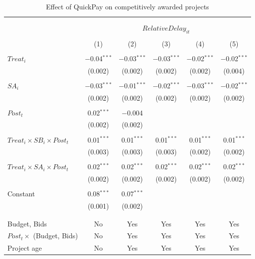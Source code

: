 \documentclass[
]{article}
\begin{document}
\begin{table}[H] \centering 
  \caption{Effect of QuickPay on competitively awarded projects} 
  \label{} 
\small 
\begin{tabular}{@{\extracolsep{-2pt}}lccccc} 
\\[-1.8ex]\hline 
\hline \\[-1.8ex] 
\\[-1.8ex] & \multicolumn{5}{c}{$RelativeDelay_{it}$  } \\ 
\\[-1.8ex] & (1) & (2) & (3) & (4) & (5)\\ 
\hline \\[-1.8ex] 
 $Treat_i$ & $-$0.04$^{***}$ & $-$0.03$^{***}$ & $-$0.03$^{***}$ & $-$0.02$^{***}$ & $-$0.02$^{***}$ \\ 
  & (0.002) & (0.002) & (0.002) & (0.002) & (0.004) \\ 
  & & & & & \\ 
 $SA_i$ & $-$0.03$^{***}$ & $-$0.01$^{***}$ & $-$0.02$^{***}$ & $-$0.03$^{***}$ & $-$0.02$^{***}$ \\ 
  & (0.002) & (0.002) & (0.002) & (0.002) & (0.002) \\ 
  & & & & & \\ 
 $Post_t$ & 0.02$^{***}$ & $-$0.004 &  &  &  \\ 
  & (0.002) & (0.002) &  &  &  \\ 
  & & & & & \\ 
 $Treat_i \times SB_i \times Post_t$ & 0.01$^{***}$ & 0.01$^{***}$ & 0.01$^{***}$ & 0.01$^{***}$ & 0.01$^{***}$ \\ 
  & (0.003) & (0.003) & (0.003) & (0.002) & (0.002) \\ 
  & & & & & \\ 
 $Treat_i \times SA_i \times Post_t$ & 0.02$^{***}$ & 0.02$^{***}$ & 0.02$^{***}$ & 0.02$^{***}$ & 0.02$^{***}$ \\ 
  & (0.002) & (0.002) & (0.002) & (0.002) & (0.002) \\ 
  & & & & & \\ 
 Constant & 0.08$^{***}$ & 0.07$^{***}$ &  &  &  \\ 
  & (0.001) & (0.002) &  &  &  \\ 
  & & & & & \\ 
\hline \\[-1.8ex] 
Budget, Bids & No & Yes & Yes & Yes & Yes \\ 
$Post_t \times $  (Budget, Bids) & No & Yes & Yes & Yes & Yes \\ 
Project age & No & Yes & Yes & Yes & Yes \\ 

\end{tabular}
\end{table}
\end{document}

